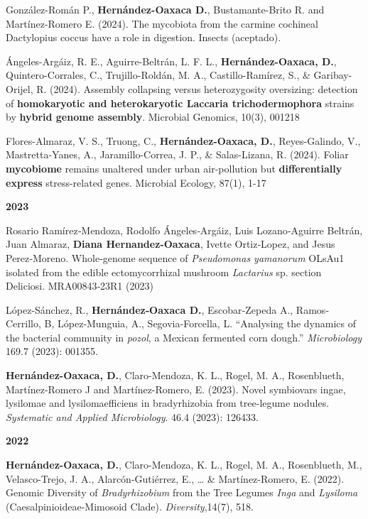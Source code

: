 \documentclass[11pt,a4paper,]{awesome-cv}
\begin{document}
González-Román P., \textbf{Hernández-Oaxaca D.}, Bustamante-Brito R. and
Martínez-Romero E. (2024). The mycobiota from the carmine cochineal
Dactylopius coccus have a role in digestion. Insects (aceptado).

Ángeles-Argáiz, R. E., Aguirre-Beltrán, L. F. L.,
\textbf{Hernández-Oaxaca, D.}, Quintero-Corrales, C., Trujillo-Roldán,
M. A., Castillo-Ramírez, S., \& Garibay-Orijel, R. (2024). Assembly
collapsing versus heterozygosity oversizing: detection of
\textbf{homokaryotic and heterokaryotic Laccaria trichodermophora}
strains by \textbf{hybrid genome assembly}. Microbial Genomics, 10(3),
001218

Flores-Almaraz, V. S., Truong, C., \textbf{Hernández-Oaxaca, D.},
Reyes-Galindo, V., Mastretta-Yanes, A., Jaramillo-Correa, J. P., \&
Salas-Lizana, R. (2024). Foliar \textbf{mycobiome} remains unaltered
under urban air-pollution but \textbf{differentially express}
stress-related genes. Microbial Ecology, 87(1), 1-17

\setlength{\leftskip}{0cm}

\textbf{2023}

\setlength{\leftskip}{1cm}

Rosario Ramírez‐Mendoza, Rodolfo Ángeles‐Argáiz, Luis Lozano‐Aguirre
Beltrán, Juan Almaraz, \textbf{Diana Hernandez‐Oaxaca}, Ivette
Ortiz‐Lopez, and Jesus Perez‐Moreno. Whole‐genome sequence of
\emph{Pseudomonas yamanorum} OLsAu1 isolated from the edible
ectomycorrhizal mushroom \emph{Lactarius} sp. section Deliciosi.
MRA00843‐23R1 (2023)

López‐Sánchez, R., \textbf{Hernández‐Oaxaca D.}, Escobar‐Zepeda A.,
Ramos‐Cerrillo, B, López‐Munguia, A., Segovia‐Forcella, L. ``Analysing
the dynamics of the bacterial community in \emph{pozol}, a Mexican
fermented corn dough.'' \emph{Microbiology} 169.7 (2023): 001355.

\textbf{Hernández-Oaxaca, D.}, Claro-Mendoza, K. L., Rogel, M. A.,
Rosenblueth, Martínez-Romero J and Martínez-Romero, E. (2023). Novel
symbiovars ingae, lysilomae and lysilomaefficiens in bradyrhizobia from
tree-legume nodules. \emph{Systematic and Applied Microbiology}. 46.4
(2023): 126433.

\setlength{\leftskip}{0cm}

\textbf{2022}

\setlength{\leftskip}{1cm}

\textbf{Hernández-Oaxaca, D.}, Claro-Mendoza, K. L., Rogel, M. A.,
Rosenblueth, M., Velasco-Trejo, J. A., Alarcón-Gutiérrez, E., \ldots{}
\& Martínez-Romero, E. (2022). Genomic Diversity of
\emph{Bradyrhizobium} from the Tree Legumes \emph{Inga} and
\emph{Lysiloma} (Caesalpinioideae-Mimosoid Clade).
\emph{Diversity},14(7), 518.
\end{document}

